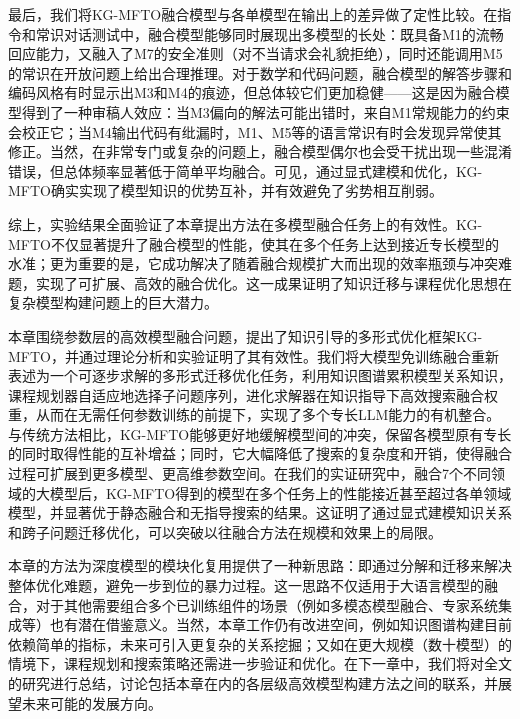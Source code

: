 \documentclass[../main.tex]{subfiles}
\begin{document}
最后，我们将KG-MFTO融合模型与各单模型在输出上的差异做了定性比较。在指令和常识对话测试中，融合模型能够同时展现出多模型的长处：既具备M1的流畅回应能力，又融入了M7的安全准则（对不当请求会礼貌拒绝），同时还能调用M5的常识在开放问题上给出合理推理。对于数学和代码问题，融合模型的解答步骤和编码风格有时显示出M3和M4的痕迹，但总体较它们更加稳健——这是因为融合模型得到了一种审稿人效应：当M3偏向的解法可能出错时，来自M1常规能力的约束会校正它；当M4输出代码有纰漏时，M1、M5等的语言常识有时会发现异常使其修正。当然，在非常专门或复杂的问题上，融合模型偶尔也会受干扰出现一些混淆错误，但总体频率显著低于简单平均融合。可见，通过显式建模和优化，KG-MFTO确实实现了模型知识的优势互补，并有效避免了劣势相互削弱。

综上，实验结果全面验证了本章提出方法在多模型融合任务上的有效性。KG-MFTO不仅显著提升了融合模型的性能，使其在多个任务上达到接近专长模型的水准；更为重要的是，它成功解决了随着融合规模扩大而出现的效率瓶颈与冲突难题，实现了可扩展、高效的融合优化。这一成果证明了知识迁移与课程优化思想在复杂模型构建问题上的巨大潜力。


本章围绕参数层的高效模型融合问题，提出了知识引导的多形式优化框架KG-MFTO，并通过理论分析和实验证明了其有效性。我们将大模型免训练融合重新表述为一个可逐步求解的多形式迁移优化任务，利用知识图谱累积模型关系知识，课程规划器自适应地选择子问题序列，进化求解器在知识指导下高效搜索融合权重，从而在无需任何参数训练的前提下，实现了多个专长LLM能力的有机整合。与传统方法相比，KG-MFTO能够更好地缓解模型间的冲突，保留各模型原有专长的同时取得性能的互补增益；同时，它大幅降低了搜索的复杂度和开销，使得融合过程可扩展到更多模型、更高维参数空间。在我们的实证研究中，融合7个不同领域的大模型后，KG-MFTO得到的模型在多个任务上的性能接近甚至超过各单领域模型，并显著优于静态融合和无指导搜索的结果。这证明了通过显式建模知识关系和跨子问题迁移优化，可以突破以往融合方法在规模和效果上的局限。

本章的方法为深度模型的模块化复用提供了一种新思路：即通过分解和迁移来解决整体优化难题，避免一步到位的暴力过程。这一思路不仅适用于大语言模型的融合，对于其他需要组合多个已训练组件的场景（例如多模态模型融合、专家系统集成等）也有潜在借鉴意义。当然，本章工作仍有改进空间，例如知识图谱构建目前依赖简单的指标，未来可引入更复杂的关系挖掘；又如在更大规模（数十模型）的情境下，课程规划和搜索策略还需进一步验证和优化。在下一章中，我们将对全文的研究进行总结，讨论包括本章在内的各层级高效模型构建方法之间的联系，并展望未来可能的发展方向。
\end{document}
